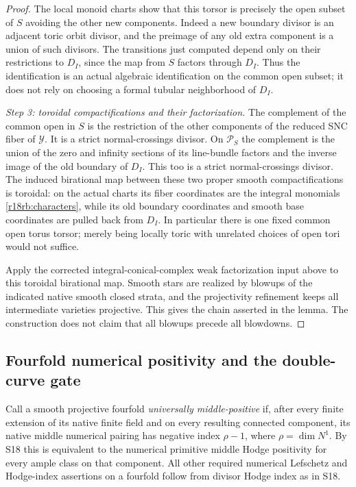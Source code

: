 \begin{proof}
The local monoid charts show that this torsor is precisely the
open subset of $S$ avoiding the other new components.  Indeed a
new boundary divisor is an adjacent toric orbit divisor, and the
preimage of any old extra component is a union of such divisors.
The transitions just computed depend only on their restrictions
to $D_I$, since the map from $S$ factors through $D_I$.  Thus the
identification is an actual algebraic identification on the common
open subset; it does not rely on choosing a formal tubular
neighborhood of $D_I$.

\emph{Step 3: toroidal compactifications and their factorization.}
The complement of the common open in $S$ is the restriction of the
other components of the reduced SNC fiber of $\mathcal Y$.
It is a strict normal-crossings divisor.  On $\mathcal P_S$ the
complement is the union of the zero and infinity sections of its
line-bundle factors and the inverse image of the old boundary of
$D_I$.  This too is a strict normal-crossings divisor.
The induced birational map between these two proper smooth
compactifications is toroidal: on the actual charts its fiber
coordinates are the integral monomials
\eqref{r18rb:characters}, while its old boundary coordinates and
smooth base coordinates are pulled back from $D_I$.
In particular there is one fixed common open torus torsor; merely
being locally toric with unrelated choices of open tori would
not suffice.

Apply the corrected integral-conical-complex weak factorization
input above to this toroidal birational map.  Smooth stars are
realized by blowups of the indicated native smooth closed strata,
and the projectivity refinement keeps all intermediate varieties
projective.  This gives the chain asserted in the lemma.  The
construction does not claim that all blowups precede all blowdowns.
\end{proof}

\subsection{Fourfold numerical positivity and the double-curve gate}

Call a smooth projective fourfold \emph{universally middle-positive}
if, after every finite extension of its native finite field and on
every resulting connected component, its native middle numerical
pairing has negative index $\rho-1$, where $\rho=\dim N^1$.
By S18 this is equivalent to the numerical primitive middle
Hodge positivity for every ample class on that component.
All other required numerical Lefschetz and Hodge-index assertions
on a fourfold follow from divisor Hodge index as in S18.

